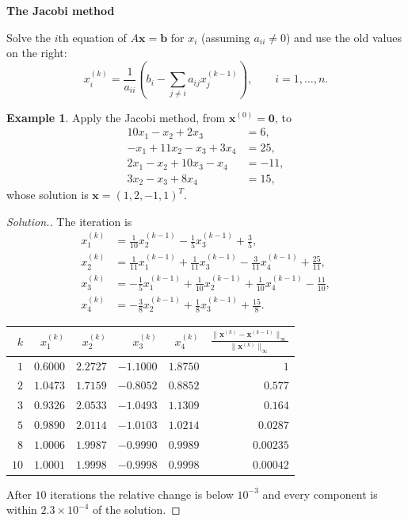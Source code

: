 \documentclass[11pt,a4paper]{article}
\numberwithin{equation}{section}
\theoremstyle{definition}
\newtheorem{exa}[thm]{Example}
\newenvironment{solution}
  {\renewcommand{\qedsymbol}{}\begin{proof}[\textit{Solution}.]}
  {\end{proof}}
\newcommand{\subhead}[1]{%
  \par\medskip\noindent\textbf{#1}\par\nobreak\smallskip}
\begin{document}
\subhead{The Jacobi method}
Solve the $i$th equation of $A\mathbf x = \mathbf b$ for $x_i$ (assuming $a_{ii}\neq0$) and use the old values on the right:
\begin{equation}\label{eq:jacobi}
x_i^{(k)} = \frac{1}{a_{ii}}\left(b_i-\sum_{j\neq i}a_{ij}x_j^{(k-1)}\right),\qquad i = 1,\dots,n .
\end{equation}

\begin{exa}
\label{exa:jacobi}
Apply the Jacobi method, from $\mathbf x^{(0)} = \mathbf 0$, to
\begin{align*}
10x_1-x_2+2x_3 &= 6,\\
-x_1+11x_2-x_3+3x_4 &= 25,\\
2x_1-x_2+10x_3-x_4 &= -11,\\
3x_2-x_3+8x_4 &= 15,
\end{align*}
whose solution is $\mathbf x = (1,2,-1,1)^T$.
\end{exa}

\begin{solution}
The iteration is
\begin{align*}
x_1^{(k)} &= \tfrac{1}{10}x_2^{(k-1)}-\tfrac15x_3^{(k-1)}+\tfrac35,\\
x_2^{(k)} &= \tfrac1{11}x_1^{(k-1)}+\tfrac1{11}x_3^{(k-1)}-\tfrac3{11}x_4^{(k-1)}+\tfrac{25}{11},\\
x_3^{(k)} &= -\tfrac15x_1^{(k-1)}+\tfrac1{10}x_2^{(k-1)}+\tfrac1{10}x_4^{(k-1)}-\tfrac{11}{10},\\
x_4^{(k)} &= -\tfrac38x_2^{(k-1)}+\tfrac18x_3^{(k-1)}+\tfrac{15}8 .
\end{align*}
\begin{center}
\begin{tabular}{rrrrrr}
\hline
$k$ & $x_1^{(k)}$ & $x_2^{(k)}$ & $x_3^{(k)}$ & $x_4^{(k)}$ & $\frac{\|\mathbf x^{(k)}-\mathbf x^{(k-1)}\|_\infty}{\|\mathbf x^{(k)}\|_\infty}$\\
\hline
$1$ & $0.6000$ & $2.2727$ & $-1.1000$ & $1.8750$ & $1$\\
$2$ & $1.0473$ & $1.7159$ & $-0.8052$ & $0.8852$ & $0.577$\\
$3$ & $0.9326$ & $2.0533$ & $-1.0493$ & $1.1309$ & $0.164$\\
$5$ & $0.9890$ & $2.0114$ & $-1.0103$ & $1.0214$ & $0.0287$\\
$8$ & $1.0006$ & $1.9987$ & $-0.9990$ & $0.9989$ & $0.00235$\\
$10$ & $1.0001$ & $1.9998$ & $-0.9998$ & $0.9998$ & $0.00042$\\
\hline
\end{tabular}
\end{center}
After $10$ iterations the relative change is below $10^{-3}$ and every component is within $2.3\times10^{-4}$ of the solution.
\end{solution}
\end{document}

